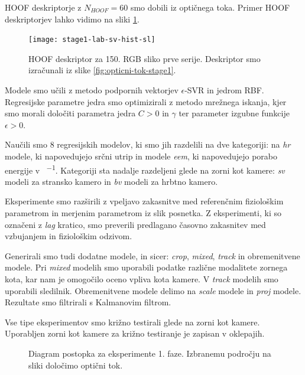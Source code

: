 HOOF deskriptorje z $N_{HOOF} = 60 $ smo dobili iz optičnega toka. Primer HOOF deskriptorjev lahko vidimo na sliki \ref{fig:hoof-znacilke}.

\begin{figure}[!htb]
	\centering
	\texttt{[image: stage1-lab-sv-hist-sl]}
	\caption[HOOF deskriptor za 150. RGB sliko prve serije]{HOOF deskriptor za 150. RGB sliko prve serije. Deskriptor smo izračunali iz slike \ref{fig:opticni-tok-stage1}.}
	\label{fig:hoof-znacilke}
\end{figure}

Modele smo učili z metodo podpornih vektorjev $\epsilon$-SVR in jedrom RBF. Regresijske parametre jedra smo optimizirali z metodo mrežnega iskanja, kjer smo morali določiti parametra jedra $C > 0$ in $\gamma$ ter parameter izgubne funkcije $\epsilon > 0$.

Naučili smo \num{8} regresijskih modelov, ki smo jih razdelili na dve kategoriji: na \textit{hr} modele, ki napovedujejo srčni utrip in modele \textit{eem}, ki napovedujejo porabo energije v \si{\kcal\per\min}. Kategoriji sta nadalje razdeljeni glede na zorni kot kamere: \textit{sv} modeli za stransko kamero in \textit{bv} modeli za hrbtno kamero. 

Eksperimente smo razširili z vpeljavo zakasnitve med referenčnim fiziološkim parametrom in merjenim parametrom iz slik posnetka. Z eksperimenti, ki so označeni z \textit{lag} kratico, smo preverili predlagano časovno zakasnitev med vzbujanjem in fiziološkim odzivom. 

Generirali smo tudi dodatne modele, in sicer: \textit{crop}, \textit{mixed}, \textit{track} in obremenitvene modele. Pri \textit{mixed} modelih smo uporabili podatke različne modalitete zornega kota, kar nam je omogočilo oceno vpliva kota kamere. V \textit{track} modelih smo uporabili sledilnik. Obremenitvene modele delimo na \textit{scale} modele in \textit{proj} modele. Rezultate smo filtrirali s Kalmanovim filtrom.

Vse tipe eksperimentov smo križno testirali glede na zorni kot kamere. Uporabljen zorni kot kamere za križno testiranje je zapisan v oklepajih.


\begin{figure}[!htb]
	\centering
	\resizebox{\columnwidth}{!}{}
	\caption[Diagram postopka za eksperimente 1. faze]{Diagram postopka za eksperimente 1. faze. Izbranemu področju na sliki določimo optični tok.}
	\label{fig:diagram-procesiranja-stage1}
\end{figure}

